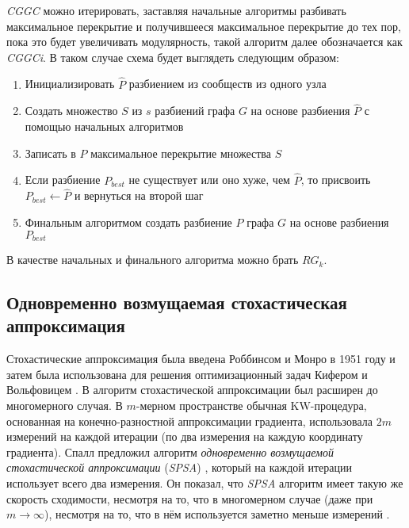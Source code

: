 \emph{CGGC} можно итерировать, заставляя начальные алгоритмы разбивать максимальное перекрытие и получившееся максимальное перекрытие до тех пор, пока это будет увеличивать модулярность, такой алгоритм далее обозначается как \emph{CGGCi}. В таком случае схема будет выглядеть следующим образом:

\begin{enumerate}
	\item Инициализировать $\hat{P}$ разбиением из сообществ из одного узла
	\item Создать множество $S$ из $s$ разбиений графа $G$ на основе разбиения $\hat{P}$ с помощью начальных алгоритмов
	\item Записать в $\hat{P}$ максимальное перекрытие множества $S$
	\item Если разбиение $P_{best}$ не существует или оно хуже, чем $\hat{P}$, то присвоить $P_{best} \leftarrow \hat{P}$ и вернуться на второй шаг
	\item Финальным алгоритмом создать разбиение $P$ графа $G$ на основе разбиения $P_{best}$ 
\end{enumerate}

В качестве начальных и финального алгоритма можно брать $RG_k$.



\subsection{Одновременно возмущаемая стохастическая аппроксимация}
Стохастические аппроксимация была введена Роббинсом и Монро в 1951 году \cite{Robbins&Monro:1951} и затем была использована для решения оптимизационный задач Кифером и Вольфовицем \cite{Kiefer&Wolfowitz:1952}. В \cite{Blum:1954} алгоритм стохастической аппроксимации был расширен до многомерного случая. В $m$-мерном пространстве обычная KW-процедура, основанная на конечно-разностной аппроксимации градиента, использовала $2m$ измерений на каждой итерации (по два измерения на каждую координату градиента). Спалл предложил алгоритм \emph{одновременно возмущаемой стохастической аппроксимации} (\emph{SPSA}) \cite{Spall:1992}, который на каждой итерации использует всего два измерения. Он показал, что \emph{SPSA} алгоритм имеет такую же скорость сходимости, несмотря на то, что в многомерном случае (даже при $m \to \infty$), несмотря на то, что в нём используется заметно меньше измерений \cite{Spall:2005}.

